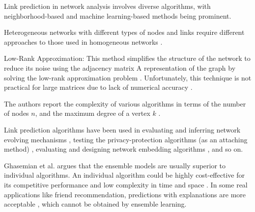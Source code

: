 

Link prediction in network analysis involves diverse algorithms, with neighborhood-based and machine learning-based methods being prominent.

Heterogeneous networks with different types of nodes and links require different approaches to those used in homogeneous networks \cite{sun2012will}.

Low-Rank Approximation: This method simplifies the structure of the network to reduce its noise using the adjacency matrix A representation of the graph by solving the low-rank approximation problem \cite{kunegis2009learning}. Unfortunately, this technique is not practical for large matrices due to lack of numerical accuracy \cite{martinez2016survey}.

The authors report the complexity of various algorithms in terms of the number of nodes $n$, and the maximum degree of a vertex $k$ \cite{martinez2016survey}.






\cite{zhou2021progresses}

Link prediction algorithms have been used in evaluating and inferring network evolving mechanisms \cite{wang2012evaluating, zhang2015measuring, zhang2017uncovering}, testing the privacy-protection algorithms (as an attaching method) \cite{xian2021towards}, evaluating and designing network embedding algorithms \cite{dehghan2022evaluating, gu2021learning}, and so on.





Ghasemian et al. \cite{ghasemian2020stacking} argues that the ensemble models are usually superior to individual algorithms.
An individual algorithm could be highly cost-effective for its competitive performance and low complexity in time and space \cite{zhou2021progresses}.
In some real applications like friend recommendation, predictions with explanations are more acceptable \cite{barbieri2014follow}, which cannot be obtained by ensemble learning.

